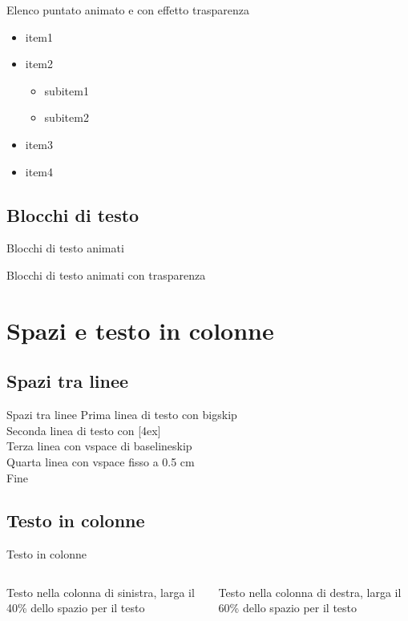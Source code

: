 \documentclass{beamer}
\begin{document}
\begin{frame}{Elenco puntato animato e con effetto trasparenza}
\begin{itemize}
	\item<1-> item1
	\item<2-> item2
	\begin{itemize}
		\item subitem1
		\item subitem2
	\end{itemize}
	\item<3-> item3
	\item<4-> item4
\end{itemize}
\end{frame}

\subsection{Blocchi di testo}
\begin{frame}{Blocchi di testo animati}
\end{frame}

\begin{frame}{Blocchi di testo animati con trasparenza}
\end{frame}

\section{Spazi e testo in colonne}
\subsection{Spazi tra linee}
\begin{frame}{Spazi tra linee}
Prima linea di testo con bigskip\\
\bigskip
Seconda linea di testo con [4ex] \\[4ex]
Terza linea con vspace di baselineskip \\
\vspace{\baselineskip}
Quarta linea con vspace fisso a 0.5 cm \\
\vspace{0.5cm}
Fine
\end{frame}

\subsection{Testo in colonne}
\begin{frame}{Testo in colonne}
\begin{columns}
	Testo nella colonna di sinistra, larga il 40\% dello spazio per il testo

	Testo nella colonna di destra, larga il 60\% dello spazio per il testo
\end{columns}
\end{frame}
\end{document}
